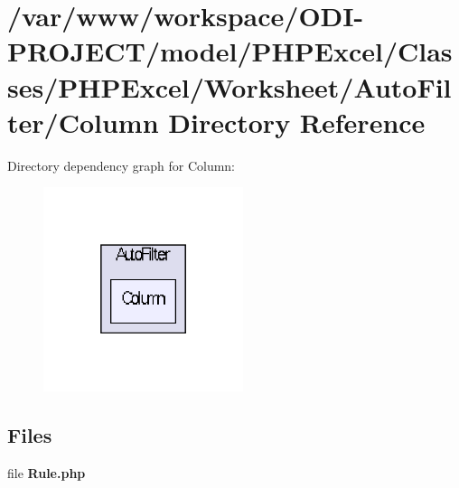\section{/var/www/workspace/\+O\+D\+I-\/\+P\+R\+O\+J\+E\+C\+T/model/\+P\+H\+P\+Excel/\+Classes/\+P\+H\+P\+Excel/\+Worksheet/\+Auto\+Filter/\+Column Directory Reference}
\label{dir_e27cb698eb5fdae7fef09b569d00573c}
Directory dependency graph for Column\+:\nopagebreak
\begin{figure}[H]
\begin{center}
\leavevmode
\includegraphics[width=166pt]{dir_e27cb698eb5fdae7fef09b569d00573c_dep}
\end{center}
\end{figure}
\subsection*{Files}
\begin{DoxyCompactItemize}
\item 
file {\bfseries Rule.\+php}
\end{DoxyCompactItemize}
